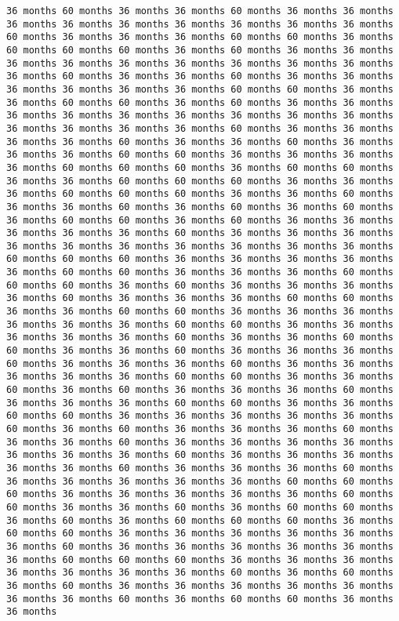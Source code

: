 \documentclass[11pt]{article}
\begin{document}
\begin{Verbatim}[commandchars=\\\{\}, frame=single, framerule=2mm, rulecolor=\color{outerrorbackground}]
36 months 60 months 36 months 36 months 60 months 36 months 36 months 36 months 36 months 36 months 36 months 36 months 36 months 36 months 60 months 36 months 36 months 36 months 60 months 60 months 36 months 60 months 60 months 60 months 36 months 60 months 36 months 36 months 36 months 36 months 36 months 36 months 36 months 36 months 36 months 36 months 60 months 36 months 36 months 60 months 36 months 36 months 36 months 36 months 36 months 36 months 60 months 60 months 36 months 36 months 60 months 60 months 36 months 60 months 36 months 36 months 36 months 36 months 36 months 36 months 36 months 36 months 36 months 36 months 36 months 36 months 36 months 60 months 36 months 36 months 36 months 36 months 60 months 36 months 36 months 60 months 36 months 36 months 36 months 60 months 60 months 36 months 36 months 36 months 36 months 60 months 60 months 60 months 36 months 60 months 60 months 36 months 36 months 60 months 60 months 60 months 36 months 36 months 36 months 60 months 60 months 60 months 36 months 36 months 60 months 36 months 36 months 60 months 36 months 60 months 36 months 60 months 36 months 60 months 60 months 36 months 60 months 36 months 36 months 36 months 36 months 36 months 60 months 36 months 36 months 36 months 36 months 36 months 36 months 36 months 36 months 36 months 36 months 60 months 60 months 60 months 36 months 36 months 36 months 36 months 36 months 60 months 60 months 36 months 36 months 36 months 60 months 60 months 60 months 36 months 60 months 36 months 36 months 36 months 36 months 60 months 36 months 36 months 36 months 60 months 60 months 36 months 36 months 60 months 60 months 36 months 36 months 36 months 36 months 36 months 36 months 60 months 60 months 36 months 36 months 36 months 36 months 36 months 60 months 36 months 36 months 60 months 60 months 36 months 36 months 60 months 36 months 36 months 36 months 60 months 36 months 36 months 36 months 60 months 36 months 36 months 36 months 36 months 36 months 60 months 60 months 36 months 36 months 60 months 36 months 60 months 36 months 36 months 36 months 60 months 36 months 36 months 36 months 60 months 60 months 36 months 36 months 60 months 60 months 36 months 36 months 36 months 36 months 36 months 60 months 36 months 60 months 36 months 36 months 36 months 60 months 36 months 36 months 60 months 36 months 36 months 36 months 36 months 36 months 36 months 36 months 60 months 36 months 36 months 36 months 36 months 36 months 60 months 36 months 36 months 36 months 60 months 36 months 36 months 36 months 36 months 36 months 60 months 60 months 60 months 36 months 36 months 36 months 36 months 36 months 60 months 60 months 36 months 36 months 60 months 36 months 60 months 60 months 36 months 60 months 36 months 60 months 60 months 60 months 36 months 60 months 60 months 36 months 36 months 36 months 36 months 36 months 36 months 60 months 36 months 36 months 36 months 36 months 36 months 36 months 60 months 60 months 60 months 36 months 36 months 36 months 36 months 36 months 36 months 36 months 60 months 36 months 60 months 36 months 60 months 36 months 36 months 36 months 36 months 36 months 36 months 36 months 60 months 36 months 60 months 60 months 36 months 36 months 
\end{Verbatim}
\end{document}
